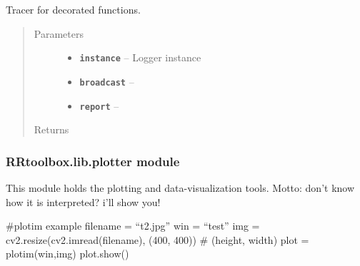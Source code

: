 \documentclass[letterpaper,10pt,english]{sphinxmanual}
\begin{document}

\begin{fulllineitems}
\label{RRtoolbox.lib:RRtoolbox.lib.inspector.tracer}
Tracer for decorated functions.
\begin{quote}\begin{description}
\item[{Parameters}] \leavevmode\begin{itemize}
\item {} 
\textbf{\texttt{instance}} -- Logger instance

\item {} 
\textbf{\texttt{broadcast}} -- 

\item {} 
\textbf{\texttt{report}} -- 

\end{itemize}

\item[{Returns}] \leavevmode


\end{description}\end{quote}

\end{fulllineitems}



\subsubsection{RRtoolbox.lib.plotter module}
\label{RRtoolbox.lib:module-RRtoolbox.lib.plotter}\label{RRtoolbox.lib:rrtoolbox-lib-plotter-module}
This module holds the plotting and data-visualization tools. Motto: don't know how it is interpreted? i'll show you!

\#plotim example
filename = ``t2.jpg''
win = ``test''
img = cv2.resize(cv2.imread(filename), (400, 400))  \# (height, width)
plot = plotim(win,img)
plot.show()
\end{document}
